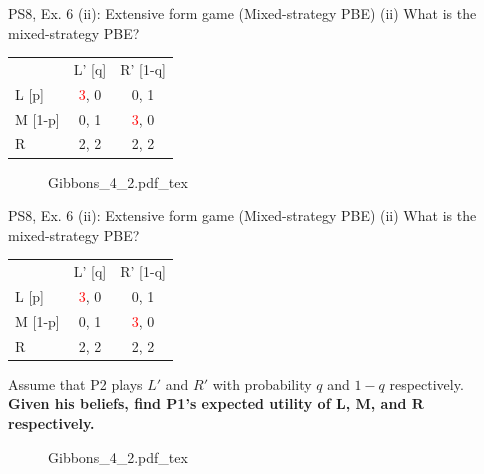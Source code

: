 \begin{frame}{PS8, Ex. 6 (ii): Extensive form game (Mixed-strategy PBE)}
    (ii) What is the mixed-strategy PBE? \vspace{-8pt}
    \begin{multicols}{2}
      \begin{table}
        \begin{tabular}{l|c|c|}
          \multicolumn{1}{c}{} & \multicolumn{1}{c}{L' [q]} & \multicolumn{1}{c}{R' [1-q]} \\\cline{2-3}
          L [p]   & \textcolor{red}{3}, 0 & 0, \color{blue}1 \\\cline{2-3}
          M [1-p] & 0, \color{blue}1 & \textcolor{red}{3}, 0 \\\cline{2-3}
          R       & 2, \color{blue}2 & 2, \color{blue}2 \\\cline{2-3}
        \end{tabular}
      \end{table} \vspace{-4pt}
      \vfill\null\columnbreak
      \begin{figure}[!h]
        \center {}
        {Gibbons_4_2.pdf_tex}
      \end{figure}
      \vfill\null
    \end{multicols}
\end{frame}
\begin{frame}{PS8, Ex. 6 (ii): Extensive form game (Mixed-strategy PBE)}
    (ii) What is the mixed-strategy PBE? \vspace{-8pt}
    \begin{multicols}{2}
      \begin{table}
        \begin{tabular}{l|c|c|}
          \multicolumn{1}{c}{} & \multicolumn{1}{c}{L' [q]} & \multicolumn{1}{c}{R' [1-q]} \\\cline{2-3}
          L [p]   & \textcolor{red}{3}, 0 & 0, \color{blue}1 \\\cline{2-3}
          M [1-p] & 0, \color{blue}1 & \textcolor{red}{3}, 0 \\\cline{2-3}
          R       & 2, \color{blue}2 & 2, \color{blue}2 \\\cline{2-3}
        \end{tabular}
      \end{table} \vspace{-4pt}
      Assume that P2 plays $L'$ and $R'$ with probability $q$ and $1-q$ respectively.\\\smallskip
      \textbf{Given his beliefs, find P1's expected utility of $\bm{L}$, $\bm{M}$, and $\bm{R}$ respectively.}
      \vfill\null\columnbreak
      \begin{figure}[!h]
        \center {}
        {Gibbons_4_2.pdf_tex}
      \end{figure}
      \vfill\null
    \end{multicols}
\end{frame}
